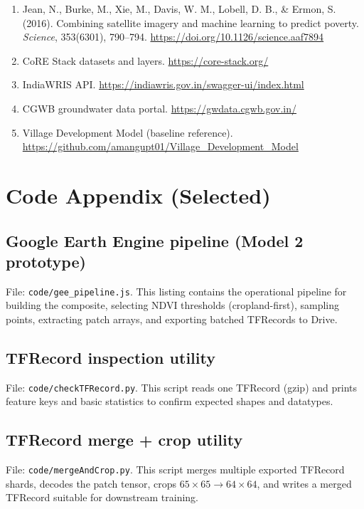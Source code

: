 \documentclass[12pt,a4paper]{report}
\begin{document}
\begin{enumerate}
  \item Jean, N., Burke, M., Xie, M., Davis, W. M., Lobell, D. B., \& Ermon, S. (2016). Combining satellite imagery and machine learning to predict poverty. \textit{Science}, 353(6301), 790--794. \url{https://doi.org/10.1126/science.aaf7894}
  \item CoRE Stack datasets and layers. \url{https://core-stack.org/}
  \item IndiaWRIS API. \url{https://indiawris.gov.in/swagger-ui/index.html}
  \item CGWB groundwater data portal. \url{https://gwdata.cgwb.gov.in/}
  \item Village Development Model (baseline reference). \url{https://github.com/amangupt01/Village_Development_Model}
\end{enumerate}

\appendix
\chapter{Code Appendix (Selected)}
\label{app:code}

\section{Google Earth Engine pipeline (Model 2 prototype)}
\begin{wiseNote}
File: \texttt{code/gee\_pipeline.js}. This listing contains the operational pipeline for building the composite, selecting NDVI thresholds (cropland-first), sampling points, extracting patch arrays, and exporting batched TFRecords to Drive.
\end{wiseNote}

\lstset{style=wise,language=Java}


\section{TFRecord inspection utility}
\begin{wiseNote}
File: \texttt{code/checkTFRecord.py}. This script reads one TFRecord (gzip) and prints feature keys and basic statistics to confirm expected shapes and datatypes.
\end{wiseNote}

\lstset{style=wise,language=Python}


\section{TFRecord merge + crop utility}
\begin{wiseNote}
File: \texttt{code/mergeAndCrop.py}. This script merges multiple exported TFRecord shards, decodes the patch tensor, crops $65\times 65 \rightarrow 64\times 64$, and writes a merged TFRecord suitable for downstream training.
\end{wiseNote}

\lstset{style=wise,language=Python}

\end{document}
